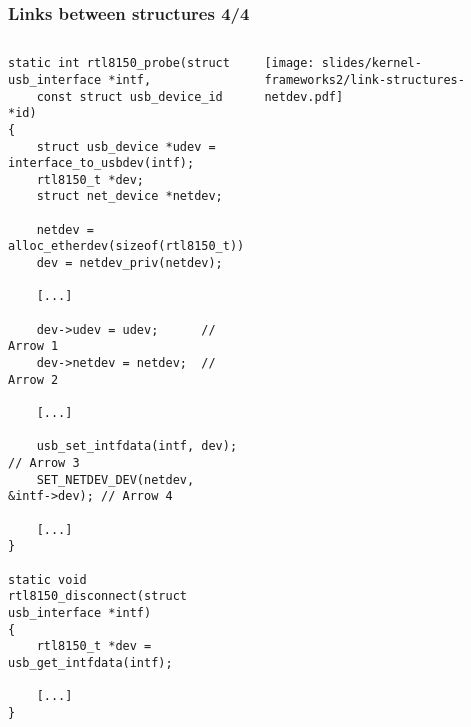 \begin{frame}[fragile]
  \frametitle{Links between structures 4/4}
  \begin{columns}
    \begin{verbatim}
static int rtl8150_probe(struct usb_interface *intf,
    const struct usb_device_id *id)
{
    struct usb_device *udev = interface_to_usbdev(intf);
    rtl8150_t *dev;
    struct net_device *netdev;

    netdev = alloc_etherdev(sizeof(rtl8150_t));
    dev = netdev_priv(netdev);

    [...]

    dev->udev = udev;      // Arrow 1
    dev->netdev = netdev;  // Arrow 2

    [...]

    usb_set_intfdata(intf, dev);        // Arrow 3
    SET_NETDEV_DEV(netdev, &intf->dev); // Arrow 4

    [...]
}

static void rtl8150_disconnect(struct usb_interface *intf)
{
    rtl8150_t *dev = usb_get_intfdata(intf);

    [...]
}
    \end{verbatim}
    \begin{center}
      \texttt{[image: slides/kernel-frameworks2/link-structures-netdev.pdf]}
    \end{center}
  \end{columns}
\end{frame}
